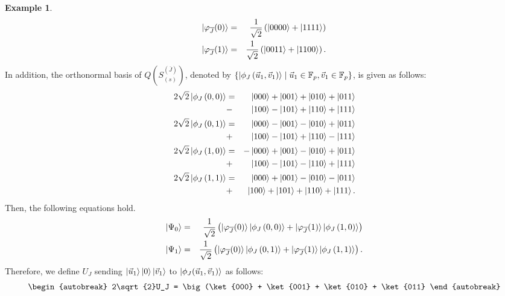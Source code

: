 \documentclass[11pt,a4paper]{article}
\theoremstyle{definition}
\newtheorem{example}{Example}
\begin{document}
\begin{example}
    \begin{eqnarray}
        \ket{\varphi_{\overline{J}}(0)} &=& \frac{1}{\sqrt{2}}\left(\ket{0000}+\ket{1111}\right)\\
        \ket{\varphi_{\overline{J}}(1)} &=& \frac{1}{\sqrt{2}}\left(\ket{0011}+\ket{1100}\right).\\
    \end{eqnarray}
    In addition, the orthonormal basis of $Q\left(S_{(s)}^{(\overline{J})}\right)$, denoted by $\left\{\ket{\phi_J\left(\vec{u}_1, \vec{v}_1\right)} \mid \vec{u}_1 \in \mathbb{F}_p, \vec{v}_1 \in \mathbb{F}_p\right\}$, is given as follows:
    \begin{eqnarray}
        2\sqrt{2}\ket{\phi_J\left(0, 0\right)} &=& \ket{000} + \ket{001} + \ket{010} + \ket{011} \nonumber\\
        &-& \ket{100} - \ket{101} + \ket{110} + \ket{111}\\
        2\sqrt{2}\ket{\phi_J\left(0, 1\right)} &=& \ket{000} - \ket{001} - \ket{010} + \ket{011} \nonumber\\
        &+& \ket{100} - \ket{101} + \ket{110} - \ket{111}\\
        2\sqrt{2}\ket{\phi_J\left(1, 0\right)} &=&-\ket{000} + \ket{001} - \ket{010} + \ket{011} \nonumber\\
        &+& \ket{100} - \ket{101} - \ket{110} + \ket{111}\\
        2\sqrt{2}\ket{\phi_J\left(1, 1\right)} &=&\ket{000} + \ket{001} - \ket{010} - \ket{011} \nonumber\\
        &+& \ket{100} + \ket{101} + \ket{110} + \ket{111}.
    \end{eqnarray}
    Then, the following equations hold.
    \begin{eqnarray}
        \ket{\Psi_{0}} &=& \frac{1}{\sqrt{2}}\left(\ket{\varphi_{\overline{J}}(0)}\ket{\phi_J\left(0, 0\right)} + \ket{\varphi_{\overline{J}}(1)}\ket{\phi_J\left(1, 0\right)}\right)\nonumber\\
        \ket{\Psi_{1}} &=& \frac{1}{\sqrt{2}}\left(\ket{\varphi_{\overline{J}}(0)}\ket{\phi_J\left(0, 1\right)} + \ket{\varphi_{\overline{J}}(1)}\ket{\phi_J\left(1, 1\right)}\right).\nonumber
    \end{eqnarray}
    Therefore, we define $U_J$ sending $\ket{\vec{u}_1}\ket{0}\ket{\vec{v}_1}$ to $\ket{\phi_J(\vec{u}_1,\vec{v}_1)}$ as follows:
\begin{align}
    \begin{autobreak}
        2\sqrt{2}U_J 
        = \big(\ket{000} + \ket{001} + \ket{010} + \ket{011} 

\end{autobreak}
\end{align}
\end{example}
\end{document}
